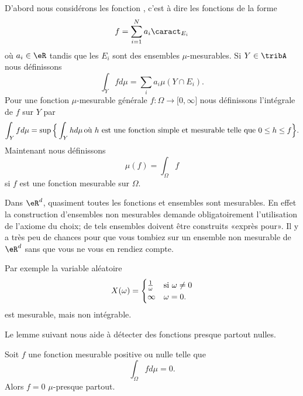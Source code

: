 D'abord nous considérons les fonction , c'est à dire les fonctions de la forme
\begin{equation}
    f=\sum_{i=1}^Na_i\caract_{E_i}
\end{equation}
où \( a_i\in\eR\) tandis que les \( E_i\) sont des ensembles \( \mu\)-mesurables. Si \( Y\in \tribA\) nous définissons
\begin{equation}
    \int_Yfd\mu=\sum_ia_i\mu(Y\cap E_i).
\end{equation}
Pour une fonction \( \mu\)-mesurable générale \( f\colon \Omega\to \mathopen[ 0 , \infty \mathclose]\) nous définissons l'intégrale de \( f\) sur \( Y\) par
\begin{equation}        \label{EqDefintYfdmu}
    \int_Yfd\mu=\sup\Big\{ \int_Yhd\mu\,\text{où \( h\) est une fonction simple et mesurable telle que \( 0\leq h\leq f\)} \Big\}.
\end{equation}
Maintenant nous définissons
\begin{equation}
    \mu(f)=\int_{\Omega}f
\end{equation}
si \( f\) est une fonction mesurable sur \( \Omega\).

\begin{remark}
    Dans \( \eR^d\), quasiment toutes les fonctions et ensembles sont mesurables. En effet la construction d'ensembles non mesurables demande obligatoirement l'utilisation de l'axiome du choix; de tels ensembles doivent être construits «exprès pour». Il y a très peu de chances pour que vous tombiez sur un ensemble non mesurable de \( \eR^d\) sans que vous ne vous en rendiez compte.

    Par exemple la variable aléatoire 
    \begin{equation}
        X(\omega)=\begin{cases}
            \frac{1}{ \omega }    &   \text{si $ \omega\neq 0$}\\
            \infty    &    \text{$\omega=0$}.
        \end{cases}
    \end{equation}
    est mesurable, mais non intégrable.
\end{remark}

Le lemme suivant nous aide à détecter des fonctions presque partout nulles.
\begin{lemma}   \label{Lemfobnwt}
    Soit \( f\) une fonction mesurable positive ou nulle telle que
    \begin{equation}
        \int_{\Omega}fd\mu=0.
    \end{equation}
    Alors \( f=0\) \( \mu\)-presque partout.
\end{lemma}

